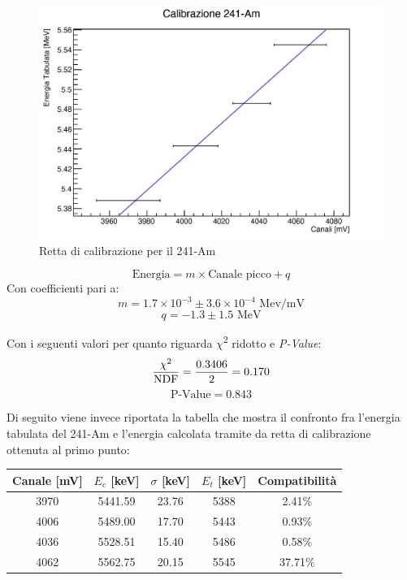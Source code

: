 \documentclass[a4paper,10pt]{article}
\newcommand*{\unit}[1]{\ensuremath{\mathrm{\,#1}}}
\begin{document}
\begin{figure}[H]
    \centering
    \includegraphics[scale=0.45]{grafici/rettaame}
    \caption{Retta di calibrazione per il 241-Am}
\end{figure}
$$
    \textrm{Energia} = m \times \textrm{Canale picco} + q
$$
Con coefficienti pari a:
$$
    m = 1.7 \times 10^{-3} \pm 3.6 \times 10^{-4}\, \unit{Mev/mV}
$$
$$
    q = - 1.3 \pm 1.5\, \unit{MeV}
$$

\noindent Con i seguenti valori per quanto riguarda $\chi$\textsuperscript{2} ridotto e \textit{P-Value}:
$$
    \frac{\chi\textsuperscript{2}}{\textrm{NDF}} = \frac{0.3406}{2} = 0.170
$$
$$
    \textrm{P-Value} = 0.843
$$

\noindent Di seguito viene invece riportata la tabella che mostra il confronto fra l'energia tabulata del 241-Am e l'energia calcolata tramite da retta di calibrazione ottenuta al primo punto:

\begin{center}
    \begin{tabular}{ccccc}
        \toprule
        Canale [mV] & $E_c$ [keV] & $\sigma$ [keV] & $E_t$ [keV] & Compatibilit\`a \\
        \midrule
        3970 & 5441.59 & 23.76 & 5388 & 2.41\%\\
        4006 & 5489.00 & 17.70 & 5443 & 0.93\%\\
        4036 & 5528.51 & 15.40 & 5486 & 0.58\%\\
        4062 & 5562.75 & 20.15 & 5545 & 37.71\%\\
        \bottomrule
    \end{tabular}\\
\end{center}
\end{document}
